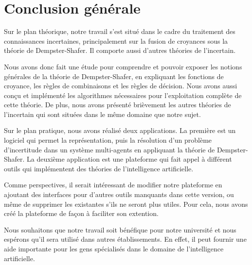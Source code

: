 {}
\chapter*{Conclusion générale}

Sur le plan théorique, notre travail s'est situé dans le cadre du traitement des connaissances incertaines,
principalement sur la fusion de croyances sous la théorie de Dempster-Shafer. Il comporte aussi d'autres
théories de l'incertain.

Nous avons donc fait une étude pour comprendre et pouvoir exposer les notions générales de la théorie de Dempster-Shafer,
en expliquant les fonctions de croyance, les règles de combinaisons et les règles de décision. 
Nous avons aussi conçu et implémenté les algorithmes nécessaires pour l'exploitation complète de cette théorie. De plus,
nous avons présenté brièvement les autres théories de l'incertain qui sont situées dans le même domaine que notre sujet.

Sur le plan pratique, nous avons réalisé deux applications. La première est un logiciel qui permet la représentation,
puis la résolution d'un problème d'incertitude dans un système multi-agents en appliquant la théorie de Dempster-Shafer.
La deuxième application est une plateforme qui fait appel à différent outils qui implémentent des théories de
l'intelligence artificielle.

Comme perspectives, il serait intéressant de modifier notre plateforme en ajoutant des interfaces pour d'autres outils
manquants dans cette version, ou même de supprimer les existantes s'ils ne seront plus utiles. Pour cela, nous avons créé
la plateforme de façon à faciliter son extention.

Nous souhaitons que notre travail soit bénéfique pour notre université et nous espérons qu'il sera utilisé dans autres
établissements. En effet, il peut fournir une aide importante pour les gens spécialisés dans le domaine de l'intelligence artificielle.